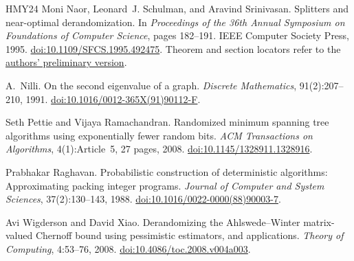 \begin{thebibliography}{HMY24}
Moni Naor, Leonard~J. Schulman, and Aravind Srinivasan.
\newblock Splitters and near-optimal derandomization.
\newblock In \emph{Proceedings of the 36th Annual Symposium on Foundations
  of Computer Science}, pages 182--191. IEEE Computer Society Press, 1995.
\newblock \href{https://doi.org/10.1109/SFCS.1995.492475}{doi:10.1109/SFCS.1995.492475}.
\newblock Theorem and section locators refer to the
\href{https://www.wisdom.weizmann.ac.il/~naor/PAPERS/splitters.pdf}{authors' preliminary version}.

A.~Nilli.
\newblock On the second eigenvalue of a graph.
\newblock \emph{Discrete Mathematics}, 91(2):207--210, 1991.
\newblock \href{https://doi.org/10.1016/0012-365X(91)90112-F}{doi:10.1016/0012-365X(91)90112-F}.

Seth Pettie and Vijaya Ramachandran.
\newblock Randomized minimum spanning tree algorithms using exponentially
  fewer random bits.
\newblock \emph{ACM Transactions on Algorithms}, 4(1):Article~5, 27 pages, 2008.
\newblock \href{https://doi.org/10.1145/1328911.1328916}{doi:10.1145/1328911.1328916}.

Prabhakar Raghavan.
\newblock Probabilistic construction of deterministic algorithms:
  Approximating packing integer programs.
\newblock \emph{Journal of Computer and System Sciences}, 37(2):130--143, 1988.
\newblock \href{https://doi.org/10.1016/0022-0000(88)90003-7}{doi:10.1016/0022-0000(88)90003-7}.

Avi Wigderson and David Xiao.
\newblock Derandomizing the Ahlswede--Winter matrix-valued Chernoff bound
  using pessimistic estimators, and applications.
\newblock \emph{Theory of Computing}, 4:53--76, 2008.
\newblock \href{https://doi.org/10.4086/toc.2008.v004a003}{doi:10.4086/toc.2008.v004a003}.

\end{thebibliography}
\endgroup
